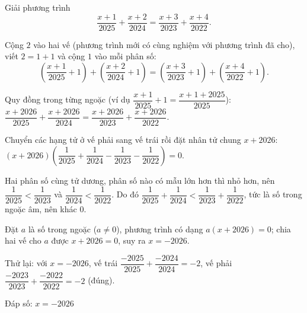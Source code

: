 \begin{problem}[8DS-PT1-010]
Giải phương trình
\[ \dfrac{x + 1}{2025} + \dfrac{x + 2}{2024} = \dfrac{x + 3}{2023} + \dfrac{x + 4}{2022}. \]

\begin{solution}
Cộng $2$ vào hai vế (phương trình mới có cùng nghiệm với phương trình đã cho), viết $2 = 1 + 1$ và cộng $1$ vào mỗi phân số:
\[ \left(\dfrac{x + 1}{2025} + 1\right) + \left(\dfrac{x + 2}{2024} + 1\right) = \left(\dfrac{x + 3}{2023} + 1\right) + \left(\dfrac{x + 4}{2022} + 1\right). \]

Quy đồng trong từng ngoặc (ví dụ $\dfrac{x + 1}{2025} + 1 = \dfrac{x + 1 + 2025}{2025}$): $\dfrac{x + 2026}{2025} + \dfrac{x + 2026}{2024} = \dfrac{x + 2026}{2023} + \dfrac{x + 2026}{2022}$.

Chuyển các hạng tử ở vế phải sang vế trái rồi đặt nhân tử chung $x + 2026$: $(x + 2026)\left(\dfrac{1}{2025} + \dfrac{1}{2024} - \dfrac{1}{2023} - \dfrac{1}{2022}\right) = 0$.

Hai phân số cùng tử dương, phân số nào có mẫu lớn hơn thì nhỏ hơn, nên $\dfrac{1}{2025} < \dfrac{1}{2023}$ và $\dfrac{1}{2024} < \dfrac{1}{2022}$. Do đó $\dfrac{1}{2025} + \dfrac{1}{2024} < \dfrac{1}{2023} + \dfrac{1}{2022}$, tức là số trong ngoặc âm, nên khác $0$.

Đặt $a$ là số trong ngoặc ($a \neq 0$), phương trình có dạng $a(x + 2026) = 0$; chia hai vế cho $a$ được $x + 2026 = 0$, suy ra $x = -2026$.

Thử lại: với $x = -2026$, vế trái $\dfrac{-2025}{2025} + \dfrac{-2024}{2024} = -2$, vế phải $\dfrac{-2023}{2023} + \dfrac{-2022}{2022} = -2$ (đúng).

Đáp số: $\boxed{x = -2026}$
\end{solution}
\end{problem}

